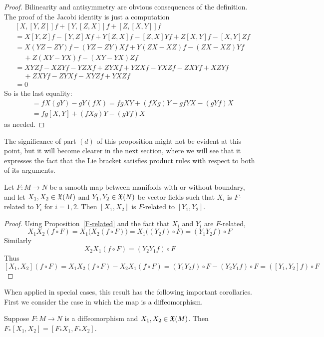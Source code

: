 \begin{proof}
Bilinearity and antisymmetry are obvious consequences of the definition. The proof of the Jacobi identity is just a computation
\begin{align*}
&[X,[Y,Z]]f+[Y,[Z,X]]f+[Z,[X,Y]]f\\
&=X[Y,Z]f-[Y,Z]Xf+Y[Z,X]f-[Z,X]Yf+Z[X,Y]f-[X,Y]Zf\\
&=X(YZ-ZY)f-(YZ-ZY)Xf+Y(ZX-XZ)f-(ZX-XZ)Yf\\
&\quad\ +Z(XY-YX)f-(XY-YX)Zf\\
&=XYZf-XZYf-YZXf+ZYXf+YZXf-YXZf-ZXYf+XZYf\\
&\quad\ +ZXYf-ZYXf-XYZf+YXZf\\
&=0
\end{align*}
So is the last equality:
\begin{align*}
[fX,gY]&=fX(gY)-gY(fX)=fgXY+(fXg)Y-gfYX-(gYf)X\\
&=fg[X,Y]+(fXg)Y-(gYf)X
\end{align*}
as needed.
\end{proof}
The significance of part $(d)$ of this proposition might not be evident at this point, but it will become clearer in the next section, where we will see that it expresses the fact that the Lie bracket satisfies product rules with respect to both of its arguments.
\begin{proposition}\label{Lie bracket natural}
Let $F:M\to N$ be a smooth map between manifolds with or without boundary, and let $X_1,X_2\in\mathfrak{X}(M)$ and $Y_1,Y_2\in\mathfrak{X}(N)$ be vector fields such that $X_i$ is $F$-related to $Y_i$ for $i=1,2$. Then $[X_1,X_2]$ is $F$-related to $[Y_1,Y_2]$.
\end{proposition}
\begin{proof}
Using Proposition~\ref{F-related} and the fact that $X_i$ and $Y_i$ are $F$-related,
\[X_1X_2(f\circ F)=X_1\big(X_2(f\circ F)\big)=X_1\big((Y_2f)\circ F\big)=(Y_1Y_2f)\circ F\]
Similarly
\[X_2X_1(f\circ F)=(Y_2Y_1f)\circ F\]
Thus
\[[X_1,X_2](f\circ F)=X_1X_2(f\circ F)-X_2X_1(f\circ F)=(Y_1Y_2f)\circ F-(Y_2Y_1f)\circ F=([Y_1,Y_2]f)\circ F\]
\end{proof}
When applied in special cases, this result has the following important corollaries. First we consider the case in which the map is a diffeomorphism.
\begin{corollary}\label{Lie bracket pushforward}
Suppose $F:M\to N$ is a diffeomorphism and $X_1,X_2\in\mathfrak{X}(M)$. Then $F_*[X_1,X_2]=[F_*X_1,F_*X_2]$.
\end{corollary}
